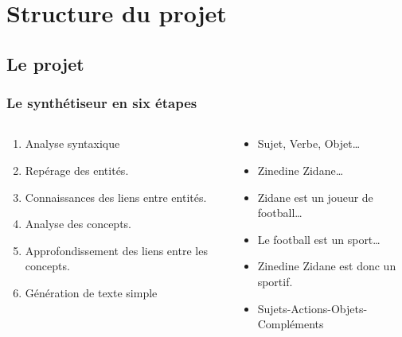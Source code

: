 \documentclass{beamer}
\begin{document}
\section{Structure du projet}

\subsection{Le projet}
\begin{frame}
\frametitle{Le synthétiseur en six étapes}

\begin{columns}[t]

\begin{column}{6cm}
\begin{enumerate} %
 \item Analyse syntaxique
 \item Repérage des entités.
 \item Connaissances des liens entre entités.
 \item Analyse des concepts.
 \item Approfondissement des liens entre les concepts.
 \item Génération de texte simple
\end{enumerate}
\end{column}

\begin{column}{6cm}
\begin{itemize}
\item Sujet, Verbe, Objet\ldots{}
\item Zinedine Zidane\ldots{}
\item Zidane est un joueur de football\ldots{}
\item Le football est un sport\ldots{}
\item Zinedine Zidane est donc un sportif.
\item Sujets-Actions-Objets-Compléments
\end{itemize}

\end{column}
\end{columns}

\end{frame}
\end{document}
